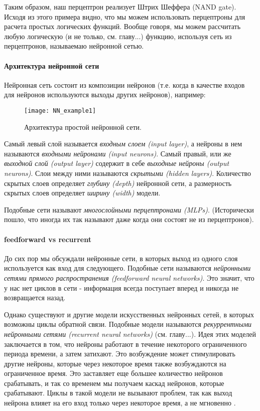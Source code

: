 Таким образом, наш перцептрон реализует Штрих Шеффера (NAND gate). 
Исходя из этого примера видно, что мы можем использовать перцептроны для 
расчета простых логических функций. Вообще говоря, мы можем рассчитать любую логическую 
(и не только, см. {\color{red} главу...}) функцию, 
используя сеть из перцептронов, называемаю нейронной сетью.

\paragraph{Архитектура нейронной сети}

Нейронная сеть состоит из композиции нейронов (т.е. когда в качестве входов для 
нейронов используются выходы других нейронов), например:

\begin{figure}[h!]
    \centering
    \texttt{[image: NN\_example1]}
    \caption{Архитектура простой нейронной сети.}
    \label{fig:NN1}
\end{figure}

Самый левый слой называется \textit{входным слоем (input layer)}, а нейроны в нем 
называются \textit{входными нейронами (input neurons)}. Самый правый, или же 
\textit{выходной слой (output layer)} содержит в себе 
\textit{выходные нейроны (output neurons)}. Слои между ними называются 
\textit{скрытыми (hidden layers)}. Количество скрытых слоев определяет 
\textit{глубину (depth)} нейронной сети, а размерность скрытых слоев 
определяет \textit{ширину (width)} модели.

Подобные сети называют \textit{многослойными перцептронами (MLPs)}. (Исторически пошло, 
что иногда их так называют даже когда они состоят не из перцептронов). 

\paragraph{feedforward vs recurrent}

До сих пор мы обсуждали нейронные сети, в которых выход из одного слоя используется как 
вход для следующего. Подобные сети называются \textit{нейронными сетями прямого распространения 
(feedforward neural networks)}. Это значит, что у нас нет циклов в сети - информация всегда 
поступает вперед и никогда не возвращается назад.

Однако существуют и другие модели искусственных нейронных сетей, 
в которых возможны циклы обратной связи. Подобные модели называются 
\textit{рекуррентными нейронными сетями (recurrent neural networks)} 
(см. {\color{red} главу...}). 
Идея этих моделей заключается в 
том, что нейроны работают в течение некоторого ограниченного периода 
времени, а затем затихают. Это возбуждение может стимулировать другие 
нейроны, которые через некоторое время также возбуждаются на ограниченное 
время. Это заставляет еще большее количество нейронов срабатывать, и 
так со временем мы получаем каскад нейронов, которые срабатывают. Циклы 
в такой модели не вызывают проблем, так как выход нейрона влияет на его 
вход только через некоторое время, а не мгновенно \cite{NN_Nielsen}.

